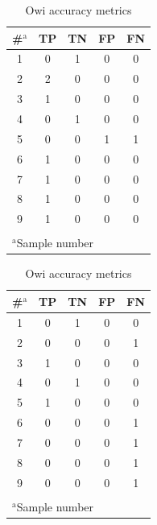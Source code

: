 \begin{table}[tb]
\begin{minipage}{.49\linewidth}
    \centering
    \caption{KLEE accuracy metrics}
    \begin{tabular}{c|c|c|c|c}
        \multicolumn{1}{c|}{\#$^{\mathrm{a}}$} & \multicolumn{1}{c}{TP} & \multicolumn{1}{c}{TN} & \multicolumn{1}{c}{FP} & \multicolumn{1}{c}{FN} \\
        \hline
        \hline
        1 & 0 & 1 & 0 & 0 \\
        2 & 2 & 0 & 0 & 0 \\
        3 & 1 & 0 & 0 & 0 \\
        4 & 0 & 1 & 0 & 0 \\
        5 & 0 & 0 & 1 & 1 \\
        6 & 1 & 0 & 0 & 0 \\
        7 & 1 & 0 & 0 & 0 \\
        8 & 1 & 0 & 0 & 0 \\
        9 & 1 & 0 & 0 & 0 \\
        \hline
        \multicolumn{5}{l}{}\\
        \multicolumn{5}{l}{$^{\mathrm{a}}$\footnotesize{Sample number}} \\
    \end{tabular}
    \label{tab:klee_accuracy}
\end{minipage}
\begin{minipage}{.49\linewidth}
    \centering
    \caption{Owi accuracy metrics}
    \begin{tabular}{c|c|c|c|c}
        \multicolumn{1}{c|}{\#$^{\mathrm{a}}$} & \multicolumn{1}{c}{TP} & \multicolumn{1}{c}{TN} & \multicolumn{1}{c}{FP} & \multicolumn{1}{c}{FN} \\
        \hline
        \hline
        1 & 0 & 1 & 0 & 0 \\
        2 & 0 & 0 & 0 & 1 \\
        3 & 1 & 0 & 0 & 0 \\
        4 & 0 & 1 & 0 & 0 \\
        5 & 1 & 0 & 0 & 0 \\
        6 & 0 & 0 & 0 & 1 \\
        7 & 0 & 0 & 0 & 1 \\
        8 & 0 & 0 & 0 & 1 \\
        9 & 0 & 0 & 0 & 1 \\
        \hline
        \multicolumn{5}{l}{}\\
        \multicolumn{5}{l}{$^{\mathrm{a}}$\footnotesize{Sample number}} \\
    \end{tabular}
    \label{tab:owi_accuracy}
\end{minipage}
\end{table}

